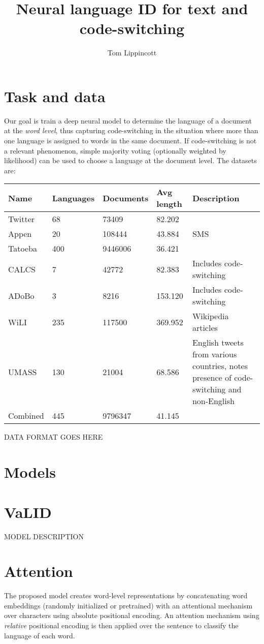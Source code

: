 \documentclass{article}
\title{Neural language ID for text and code-switching}
\author{Tom Lippincott}
\begin{document}
\maketitle

\section*{Task and data}
Our goal is train a deep neural model to determine the language of a document at the \emph{word level}, thus capturing code-switching in the situation where more than one language is assigned to words in the same document.  If code-switching is not a relevant phenomenon, simple majority voting (optionally weighted by likelihood) can be used to choose a language at the document level.  The datasets are:

\begin{table*}[h]
\begin{tabular}{llllp{}}
\hline
Name & Languages & Documents & Avg length & Description \\
\hline
Twitter & 68 & 73409 & 82.202 & \\
Appen & 20 & 108444 & 43.884 & SMS \\
Tatoeba & 400 & 9446006 & 36.421 & \\
CALCS & 7 & 42772 & 82.383 & Includes code-switching \\
ADoBo & 3 & 8216 & 153.120 & Includes code-switching \\
WiLI & 235 & 117500 & 369.952 & Wikipedia articles \\
UMASS & 130 & 21004 & 68.586 & English tweets from various countries, notes presence of code-switching and non-English \\
Combined & 445 & 9796347 & 41.145 & \\
\hline
\end{tabular}
\end{table*}

DATA FORMAT GOES HERE

\section*{Models}

\section*{VaLID}
MODEL DESCRIPTION

\section*{Attention}
The proposed model creates word-level representations by concatenating word embeddings (randomly initialized or pretrained) with an attentional mechanism over characters using absolute positional encoding.  An attention mechanism using \emph{relative} positional encoding is then applied over the sentence to classify the language of each word.
\end{document}
